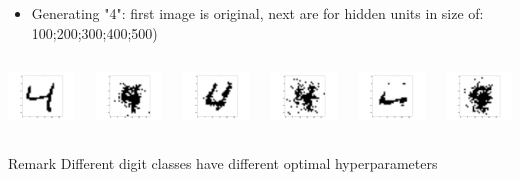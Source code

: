 \documentclass{beamer}
\begin{document}
\begin{frame}[plain]
\begin{columns}
\begin{column}{0.15\textwidth}
		\end{column}
    \end{columns}
    \begin{itemize}
    \item Generating "4": first image is original, next are for hidden units in size of: 100;200;300;400;500)
    \end{itemize}
    \begin{columns}
		\begin{column}{0.15\textwidth}
            \includegraphics[width=2cm]{images/4original.png}
		\end{column}
		\begin{column}{0.15\textwidth}
			\includegraphics[width=2cm]{images/4Hidden100.png}
		\end{column}
		\begin{column}{0.15\textwidth}
			\includegraphics[width=2cm]{images/4Hidden200.png}
		\end{column}
		\begin{column}{0.15\textwidth}
			\includegraphics[width=2cm]{images/4Hidden300.png}
		\end{column}
		\begin{column}{0.15\textwidth}
			\includegraphics[width=2cm]{images/4Hidden400.png}
		\end{column}
		\begin{column}{0.15\textwidth}
			\includegraphics[width=2cm]{images/4Hidden500.png}
		\end{column}
    \end{columns}
    \begin{alertblock}{Remark}
	Different digit classes have different optimal hyperparameters
	\end{alertblock}
  \end{frame}
\end{document}
